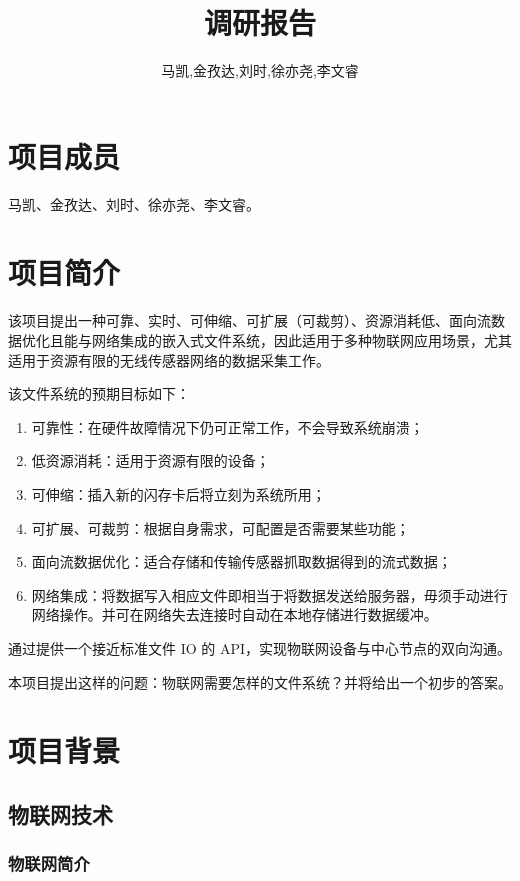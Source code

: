 \documentclass{ctexart}
\begin{document}
\title{调研报告}
\author{马凯,金孜达,刘时,徐亦尧,李文睿}
\maketitle
\tableofcontents
\newpage

\section{项目成员}

马凯、金孜达、刘时、徐亦尧、李文睿。

\section{项目简介}

该项目提出一种可靠、实时、可伸缩、可扩展（可裁剪）、资源消耗低、面向流数据优化且能与网络集成的嵌入式文件系统，因此适用于多种物联网应用场景，尤其适用于资源有限的无线传感器网络的数据采集工作。

该文件系统的预期目标如下：
\begin{enumerate}
	\item 可靠性：在硬件故障情况下仍可正常工作，不会导致系统崩溃；
	\item 低资源消耗：适用于资源有限的设备；
	\item 可伸缩：插入新的闪存卡后将立刻为系统所用；
	\item 可扩展、可裁剪：根据自身需求，可配置是否需要某些功能；
	\item 面向流数据优化：适合存储和传输传感器抓取数据得到的流式数据；
	\item 网络集成：将数据写入相应文件即相当于将数据发送给服务器，毋须手动进行网络操作。并可在网络失去连接时自动在本地存储进行数据缓冲。
\end{enumerate}

通过提供一个接近标准文件 IO 的 API，实现物联网设备与中心节点的双向沟通。

本项目提出这样的问题：物联网需要怎样的文件系统？并将给出一个初步的答案。

\section{项目背景}

\subsection{物联网技术}

\subsubsection{物联网简介}
\end{document}
